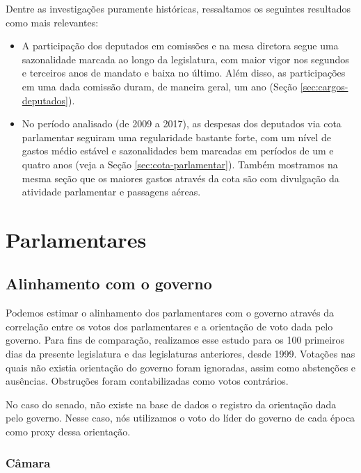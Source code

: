 \documentclass[12pt,a4paper]{article}
\begin{document}
Dentre as investigações puramente históricas, ressaltamos os seguintes resultados como mais relevantes:
\begin{itemize}

    \item A participação dos deputados em comissões e na mesa diretora segue uma
    sazonalidade marcada ao longo da legislatura, com maior vigor nos segundos e terceiros anos de mandato e baixa no último. Além disso, as participações em uma
    dada comissão duram, de maneira geral, um ano (Seção \ref{sec:cargos-deputados}).

    \item No período analisado (de 2009 a 2017), as despesas dos deputados via cota parlamentar seguiram uma regularidade bastante forte, com um nível de gastos médio
    estável e sazonalidades bem marcadas em períodos de um e quatro anos (veja a Seção \ref{sec:cota-parlamentar}). Também mostramos na mesma seção que os
    maiores gastos através da cota são com divulgação da atividade parlamentar e passagens aéreas.
    
    
\end{itemize}


\section{Parlamentares}


\subsection{Alinhamento com o governo}
\label{sec:apoio-governo}

Podemos estimar o alinhamento dos parlamentares com o governo através da correlação entre os votos dos parlamentares e a orientação de voto
dada pelo governo. Para fins de comparação, realizamos esse estudo para os 100 primeiros dias da presente legislatura
e das legislaturas anteriores, desde 1999. Votações nas quais não existia orientação do governo foram ignoradas, assim como abstenções e ausências. Obstruções foram contabilizadas como votos contrários. 

No caso do senado, não existe na base de dados o registro da orientação dada pelo governo. Nesse caso, nós utilizamos o voto do líder do governo de cada época como proxy dessa orientação. 

\subsubsection{Câmara}
\label{sec:apoio-governo-camara}
\end{document}
